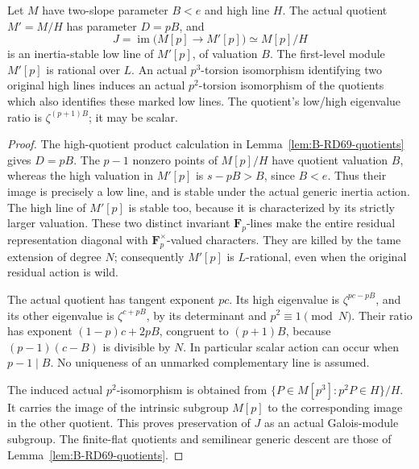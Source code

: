 \begin{lemma}
\label{lem:B-RD71-marked-low}
Let \(M\) have two-slope parameter \(B<e\) and high line \(H\).
The actual quotient \(M'=M/H\) has parameter \(D=pB\), and
\[
 J=\operatorname{im}\bigl(M[p]\longrightarrow M'[p]\bigr)
   \simeq M[p]/H
 \tag{B-RD71.3}
\]
is an inertia-stable low line of \(M'[p]\), of valuation \(B\).
The first-level module \(M'[p]\) is rational over \(L\).
An actual \(p^3\)-torsion isomorphism identifying two original
high lines induces an actual \(p^2\)-torsion isomorphism of
the quotients which also identifies these marked low lines.
The quotient's low/high eigenvalue ratio is
\(\zeta^{(p+1)B}\); it may be scalar.
\end{lemma}
\begin{proof}
The high-quotient product calculation in
Lemma~\ref{lem:B-RD69-quotients} gives \(D=pB\).
The \(p-1\) nonzero points of \(M[p]/H\) have quotient
valuation \(B\), whereas the high valuation in \(M'[p]\)
is \(s-pB>B\), since \(B<e\).
Thus their image is precisely a low line, and is stable
under the actual generic inertia action.
The high line of \(M'[p]\) is stable too, because it is
characterized by its strictly larger valuation.
These two distinct invariant \(\mathbf F_p\)-lines make
the entire residual representation diagonal with
\(\mathbf F_p^\times\)-valued characters. They are killed
by the tame extension of degree \(N\); consequently \(M'[p]\)
is \(L\)-rational, even when the original residual action is wild.

The actual quotient has tangent exponent \(pc\).
Its high eigenvalue is \(\zeta^{pc-pB}\), and its other
eigenvalue is \(\zeta^{c+pB}\), by its determinant and
\(p^2\equiv1\pmod N\). Their ratio has exponent
\((1-p)c+2pB\), congruent to \((p+1)B\), because
\((p-1)(c-B)\) is divisible by \(N\).
In particular scalar action can occur when \(p-1\mid B\).
No uniqueness of an unmarked complementary line is assumed.

The induced actual \(p^2\)-isomorphism is obtained from
\(\{P\in M[p^3]:p^2P\in H\}/H\).
It carries the image of the intrinsic subgroup \(M[p]\)
to the corresponding image in the other quotient. This
proves preservation of \(J\) as an actual Galois-module
subgroup. The finite-flat quotients and semilinear generic
descent are those of Lemma~\ref{lem:B-RD69-quotients}.
\end{proof}

